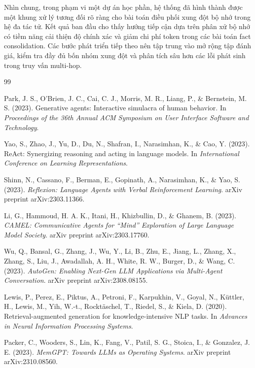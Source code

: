\documentclass[12pt,a4paper]{article}
\begin{document}
Nhìn chung, trong phạm vi một dự án học phần, hệ thống đã hình thành được một khung xử lý tương đối rõ ràng cho bài toán điều phối xung đột bộ nhớ trong hệ đa tác tử. Kết quả ban đầu cho thấy hướng tiếp cận dựa trên phân xử bộ nhớ có tiềm năng cải thiện độ chính xác và giảm chi phí token trong các bài toán fact consolidation. Các bước phát triển tiếp theo nên tập trung vào mở rộng tập đánh giá, kiểm tra đầy đủ bốn nhóm xung đột và phân tích sâu hơn các lỗi phát sinh trong truy vấn multi-hop.


\newpage
{}
{}

\begin{thebibliography}{99}

Park, J. S., O'Brien, J. C., Cai, C. J., Morris, M. R., Liang, P.,
\& Bernstein, M. S. (2023).
Generative agents: Interactive simulacra of human behavior.
In \textit{Proceedings of the 36th Annual ACM Symposium on User Interface Software and Technology}.

Yao, S., Zhao, J., Yu, D., Du, N., Shafran, I., Narasimhan, K.,
\& Cao, Y. (2023).
ReAct: Synergizing reasoning and acting in language models.
In \textit{International Conference on Learning Representations}.

Shinn, N., Cassano, F., Berman, E., Gopinath, A., Narasimhan, K.,
\& Yao, S. (2023).
\textit{Reflexion: Language Agents with Verbal Reinforcement Learning}.
arXiv preprint arXiv:2303.11366.

Li, G., Hammoud, H. A. K., Itani, H., Khizbullin, D.,
\& Ghanem, B. (2023).
\textit{CAMEL: Communicative Agents for ``Mind'' Exploration of Large Language Model Society}.
arXiv preprint arXiv:2303.17760.

Wu, Q., Bansal, G., Zhang, J., Wu, Y., Li, B., Zhu, E., Jiang, L.,
Zhang, X., Zhang, S., Liu, J., Awadallah, A. H., White, R. W.,
Burger, D., \& Wang, C. (2023).
\textit{AutoGen: Enabling Next-Gen LLM Applications via Multi-Agent Conversation}.
arXiv preprint arXiv:2308.08155.

Lewis, P., Perez, E., Piktus, A., Petroni, F., Karpukhin, V., Goyal, N.,
Küttler, H., Lewis, M., Yih, W.-t., Rocktäschel, T., Riedel, S., \& Kiela, D. (2020).
Retrieval-augmented generation for knowledge-intensive NLP tasks.
In \textit{Advances in Neural Information Processing Systems}.

Packer, C., Wooders, S., Lin, K., Fang, V., Patil, S. G., Stoica, I.,
\& Gonzalez, J. E. (2023).
\textit{MemGPT: Towards LLMs as Operating Systems}.
arXiv preprint arXiv:2310.08560.


\end{thebibliography}
\end{document}
